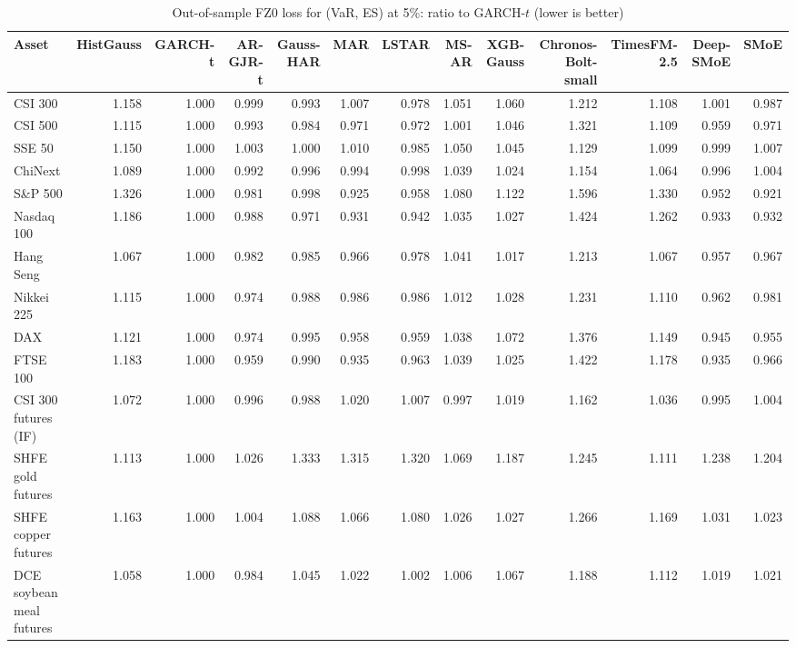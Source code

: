 \begin{table}[!htbp]\centering\scriptsize
\caption{Out-of-sample FZ0 loss for (VaR, ES) at 5\%: ratio to GARCH-$t$ (lower is better)}\label{tab:loss_FZ5}
\begin{adjustbox}{max width=\textwidth}
\begin{tabular}{lrrrrrrrrrrrr}
\toprule
Asset & HistGauss & GARCH-t & AR-GJR-t & Gauss-HAR & MAR & LSTAR & MS-AR & XGB-Gauss & Chronos-Bolt-small & TimesFM-2.5 & Deep-SMoE & SMoE\\
\midrule
CSI 300 & 1.158 & 1.000 & 0.999 & 0.993 & 1.007 & 0.978 & 1.051 & 1.060 & 1.212 & 1.108 & 1.001 & 0.987\\
CSI 500 & 1.115 & 1.000 & 0.993 & 0.984 & 0.971 & 0.972 & 1.001 & 1.046 & 1.321 & 1.109 & 0.959 & 0.971\\
SSE 50 & 1.150 & 1.000 & 1.003 & 1.000 & 1.010 & 0.985 & 1.050 & 1.045 & 1.129 & 1.099 & 0.999 & 1.007\\
ChiNext & 1.089 & 1.000 & 0.992 & 0.996 & 0.994 & 0.998 & 1.039 & 1.024 & 1.154 & 1.064 & 0.996 & 1.004\\
S\&P 500 & 1.326 & 1.000 & 0.981 & 0.998 & 0.925 & 0.958 & 1.080 & 1.122 & 1.596 & 1.330 & 0.952 & 0.921\\
Nasdaq 100 & 1.186 & 1.000 & 0.988 & 0.971 & 0.931 & 0.942 & 1.035 & 1.027 & 1.424 & 1.262 & 0.933 & 0.932\\
Hang Seng & 1.067 & 1.000 & 0.982 & 0.985 & 0.966 & 0.978 & 1.041 & 1.017 & 1.213 & 1.067 & 0.957 & 0.967\\
Nikkei 225 & 1.115 & 1.000 & 0.974 & 0.988 & 0.986 & 0.986 & 1.012 & 1.028 & 1.231 & 1.110 & 0.962 & 0.981\\
DAX & 1.121 & 1.000 & 0.974 & 0.995 & 0.958 & 0.959 & 1.038 & 1.072 & 1.376 & 1.149 & 0.945 & 0.955\\
FTSE 100 & 1.183 & 1.000 & 0.959 & 0.990 & 0.935 & 0.963 & 1.039 & 1.025 & 1.422 & 1.178 & 0.935 & 0.966\\
CSI 300 futures (IF) & 1.072 & 1.000 & 0.996 & 0.988 & 1.020 & 1.007 & 0.997 & 1.019 & 1.162 & 1.036 & 0.995 & 1.004\\
SHFE gold futures & 1.113 & 1.000 & 1.026 & 1.333 & 1.315 & 1.320 & 1.069 & 1.187 & 1.245 & 1.111 & 1.238 & 1.204\\
SHFE copper futures & 1.163 & 1.000 & 1.004 & 1.088 & 1.066 & 1.080 & 1.026 & 1.027 & 1.266 & 1.169 & 1.031 & 1.023\\
DCE soybean meal futures & 1.058 & 1.000 & 0.984 & 1.045 & 1.022 & 1.002 & 1.006 & 1.067 & 1.188 & 1.112 & 1.019 & 1.021\\

\end{tabular}
\end{adjustbox}
\end{table}
